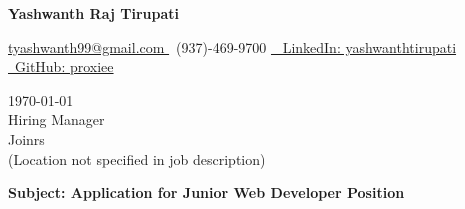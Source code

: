 \documentclass[letterpaper,11pt]{article}
\begin{document}
\begin{center}
    \textbf{\LARGE Yashwanth Raj Tirupati}
    \vspace{4pt}
    
    \small
    \href{mailto:tyashwanth99@gmail.com}{ tyashwanth99@gmail.com }\textbar
     ~(937)-469-9700 \textbar
    \href{https://linkedin.com/in/yashwanthtirupati}{~ LinkedIn: yashwanthtirupati }\textbar 
    \href{https://github.com/proxiee}{~GitHub: proxiee }
\end{center}

\vspace{20pt}

\begin{flushleft}
    \today \\
    \vspace{12pt}
    Hiring Manager \\
    Joinrs \\
    (Location not specified in job description) \\
\end{flushleft}


\begin{flushleft}
\textbf{Subject: Application for Junior Web Developer Position}
\end{flushleft}


\end{document}
